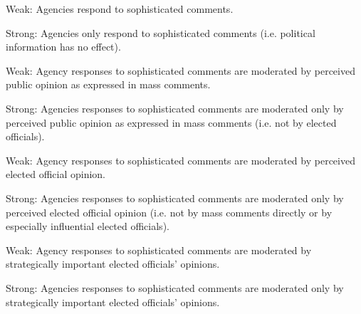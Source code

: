 \begin{subhyp}

\begin{hyp}\label{hyp:ds}
Weak: Agencies respond to sophisticated comments.

Strong: Agencies only respond to sophisticated comments (i.e. political information has no effect).
\end{hyp}

\begin{hyp}\label{hyp:dn}
Weak: Agency responses to sophisticated comments are moderated by perceived public opinion as expressed in mass comments.

Strong: Agencies responses to sophisticated comments are moderated only by perceived public opinion as expressed in mass comments (i.e. not by elected officials).
\end{hyp}

\begin{hyp}\label{hyp:in}
Weak: Agency responses to sophisticated comments are moderated by perceived elected official opinion.

Strong: Agencies responses to sophisticated comments are moderated only by perceived elected official opinion (i.e. not by mass comments directly or by especially influential elected officials).
\end{hyp}

\begin{hyp}\label{hyp:is}
Weak: Agency responses to sophisticated comments are moderated by strategically important elected officials' opinions.

Strong: Agencies responses to sophisticated comments are moderated only by strategically important elected officials' opinions.
\end{hyp}

\end{subhyp}

%


